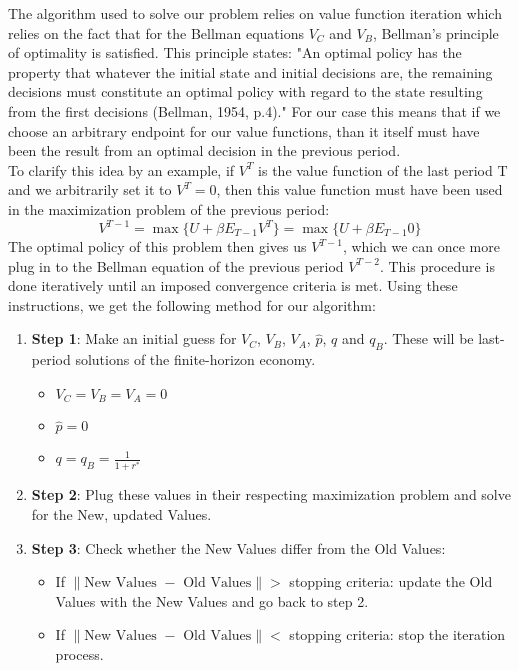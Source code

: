 The algorithm used to solve our problem relies on value function iteration which relies on the fact that for the Bellman equations $V_C$ and $V_B$, Bellman's principle of optimality is satisfied. This principle states: "An optimal policy has the property that whatever the initial state and initial decisions are, the remaining decisions must constitute an optimal policy with regard to the state resulting from the first decisions (Bellman, 1954, p.4)." For our case this means that if we choose an arbitrary endpoint for our value functions, than it itself must have been the result from an optimal decision in the previous period.\\

To clarify this idea by an example, if $V^T$ is the value function of the last period T and we arbitrarily set it to $V^T = 0$, then this value function must have been used in the maximization problem of the previous period:
\begin{equation*}
    V^{T-1} = \max\{ U + \beta E_{T-1} V^T\} = \max\{U + \beta E_{T-1} 0\}
\end{equation*}
The optimal policy of this problem then gives us $V^{T-1}$, which we can once more plug in to the Bellman equation of the previous period $V^{T-2}$. This procedure is done iteratively until an imposed convergence criteria is met. Using these instructions, we get the following method for our algorithm: \\
\begin{enumerate}
    \item\textbf{Step 1}: Make an initial guess for $V_C$, $V_B$, $V_A$, $\hat{p}$, $q$ and $q_B$. These will be last-period solutions of the finite-horizon economy.
    \begin{itemize}
        \item $V_C = V_B = V_A = 0$
        \item $\hat{p} = 0$
        \item $q = q_B = \frac{1}{1+r^*}$
    \end{itemize}
    \item\textbf{Step 2}: Plug these values in their respecting maximization problem and solve for the New, updated Values.
    \item\textbf{Step 3}: Check whether the New Values differ from the Old Values:
    \begin{itemize}
        \item If $\|\text{New Values } - \text{ Old Values}\| >$ stopping criteria: update the Old Values with the New Values and go back to step 2.
        \item If $\|\text{New Values } - \text{ Old Values}\| <$ stopping criteria: stop the iteration process.
    \end{itemize}
\end{enumerate}

